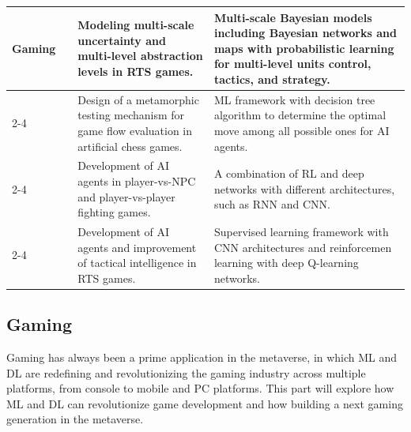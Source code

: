 \documentclass[journal]{IEEEtran}
\begin{document}
\begin{table}[ht!]
\begin{tabular}{|p{2.35cm}|p{0.75cm}|p{5.75cm}|p{7.65cm}|}
Gaming 
& \cite{synnaeve2016multiscale}	& Modeling multi-scale uncertainty and multi-level abstraction levels in RTS games.	& Multi-scale Bayesian models including Bayesian networks and maps with probabilistic learning for multi-level units control, tactics, and strategy.\\ \cline{2-4}
& \cite{liaqat2020metamorphic}	& Design of a metamorphic testing mechanism for game flow evaluation in artificial chess games.	& ML framework with decision tree algorithm to determine the optimal move among all possible ones for AI agents. \\ \cline{2-4}
& \cite{oh2021creating}	& Development of AI agents in player-vs-NPC and player-vs-player fighting games.	& A combination of RL and deep networks with different architectures, such as RNN and CNN.\\ \cline{2-4}
& \cite{barriga2019improving}	& Development of AI agents and improvement of tactical intelligence in RTS games.	& Supervised learning framework with CNN architectures and reinforcemen learning with deep Q-learning networks. 
\\ \hline\hline

\end{tabular}%
\label{tab_applicationAspect}
\end{table}

\subsection{Gaming}
Gaming has always been a prime application in the metaverse, in which ML and DL are redefining and revolutionizing the gaming industry across multiple platforms, from console to mobile and PC platforms. This part will explore how ML and DL can revolutionize game development and how building a next gaming generation in the metaverse.
\end{document}
